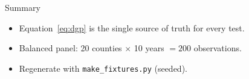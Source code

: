 \documentclass[11pt]{beamer}
\begin{document}
\begin{frame}{Summary}
  \begin{itemize}
    \item Equation~\eqref{eq:dgp} is the single source of truth for every test.
    \item Balanced panel: 20 counties $\times$ 10 years $= 200$ observations.
    \item Regenerate with \texttt{make\_fixtures.py} (seeded).
  \end{itemize}
  \vfill
  
  
\end{frame}
\end{document}
